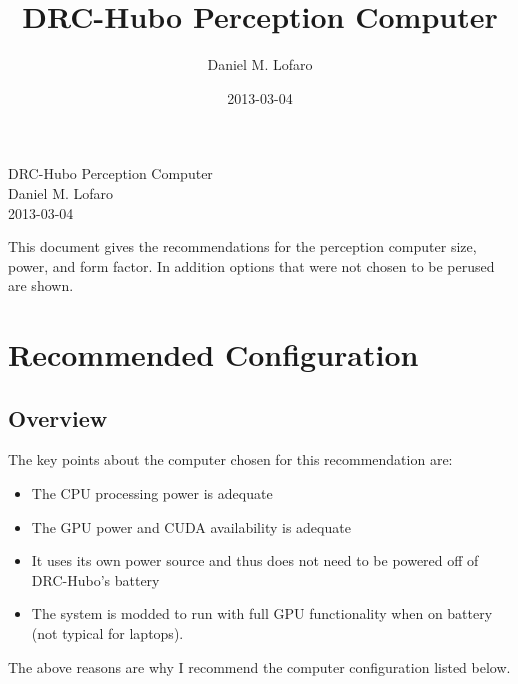 \documentclass{article}
\begin{document}
\title{DRC-Hubo Perception Computer}
\author{Daniel M. Lofaro}
\date{2013-03-04}

\begin{center}
\Large DRC-Hubo Perception Computer\\
\large
Daniel M. Lofaro\\
2013-03-04\\
\end{center}
\normalsize
This document gives the recommendations for the perception computer size, power, and form factor.
In addition options that were not chosen to be perused are shown.

\section{Recommended Configuration}
\subsection{Overview}
The key points about the computer chosen for this recommendation are:
\begin{itemize}
\item The CPU processing power is adequate
\item The GPU power and CUDA availability is adequate
\item It uses its own power source and thus does not need to be powered off of DRC-Hubo's battery
\item The system is modded to run with full GPU functionality when on battery (not typical for laptops).
\end{itemize}

The above reasons are why I recommend the computer configuration listed below.
\end{document}
